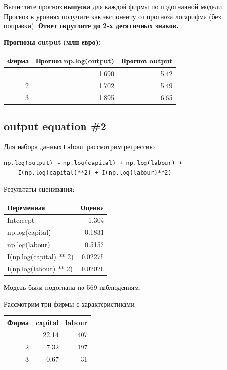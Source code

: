 \documentclass[
  russian,
]{article}
\newcounter{none} %
\begin{document}
Вычислите прогноз \textbf{выпуска} для каждой фирмы по подогнанной
модели. Прогноз в уровнях получите как экспоненту от прогноза логарифма
(без поправки). \textbf{Ответ округлите до 2-х десятичных знаков.}

\textbf{Прогнозы output (млн евро):}

{\def\LTcaptype{none} %
\begin{longtable}[]{@{}rrr@{}}
\toprule\noalign{}
Фирма & Прогноз np.log(output) & Прогноз output \\
\midrule\noalign{}
\endhead
\bottomrule\noalign{}
\endlastfoot
1 & 1.690 & 5.42 \\
2 & 1.702 & 5.49 \\
3 & 1.895 & 6.65 \\
\end{longtable}
}

\subsection{output equation \#2}\label{output-equation-2}

Для набора данных \texttt{Labour} рассмотрим регрессию

\begin{verbatim}
np.log(output) ~ np.log(capital) + np.log(labour) +
    I(np.log(capital)**2) + I(np.log(labour)**2)
\end{verbatim}

Результаты оценивания:

{\def\LTcaptype{none} %
\begin{longtable}[]{@{}lr@{}}
\toprule\noalign{}
Переменная & Оценка \\
\midrule\noalign{}
\endhead
\bottomrule\noalign{}
\endlastfoot
Intercept & -1.304 \\
np.log(capital) & 0.1831 \\
np.log(labour) & 0.5153 \\
I(np.log(capital) ** 2) & 0.02275 \\
I(np.log(labour) ** 2) & 0.02026 \\
\end{longtable}
}

Модель была подогнана по 569 наблюдениям.

Рассмотрим три фирмы с характеристиками

{\def\LTcaptype{none} %
\begin{longtable}[]{@{}rrr@{}}
\toprule\noalign{}
Фирма & capital & labour \\
\midrule\noalign{}
\endhead
\bottomrule\noalign{}
\endlastfoot
1 & 22.14 & 407 \\
2 & 7.32 & 197 \\
3 & 0.67 & 31 \\
\end{longtable}
}
\end{document}
